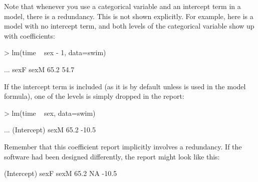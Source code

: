 Note that whenever you use a categorical variable and an intercept
term in a model, there is a redundancy.  This is not shown explicitly.
For example, here is a model with no intercept term, and both levels
of the categorical variable  show up with coefficients:
\begin{Schunk}
\begin{Sinput}
> lm(time ~ sex - 1, data=swim)
\end{Sinput}
\begin{Soutput}
...
sexF  sexM  
65.2  54.7  
\end{Soutput}
\end{Schunk}
If the intercept term is included (as it is by default unless
 is used in the model formula), one of the levels is simply
dropped in the report:
\begin{Schunk}
\begin{Sinput}
> lm(time ~ sex, data=swim)
\end{Sinput}
\begin{Soutput}
...
(Intercept)         sexM  
       65.2        -10.5  
\end{Soutput}
\end{Schunk}
Remember that this coefficient report implicitly involves a
redundancy.  If the software had been designed differently, the report
might look like this:
\begin{Schunk}
\begin{Soutput}
(Intercept)     sexF      sexM     
       65.2       NA     -10.5  
\end{Soutput}
\end{Schunk}


